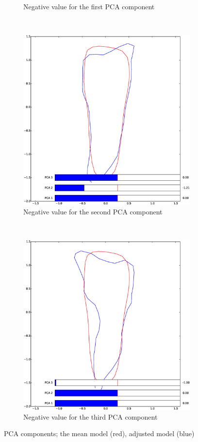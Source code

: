\documentclass[a4paper,10pt]{article}
\begin{document}
\begin{figure}[htbp]
\begin{subfigure}{0.30\textwidth}
		\caption{Negative value for the first PCA component}
	\end{subfigure}
	~
	\begin{subfigure}{0.30\textwidth}
		\centering
		\includegraphics[width=\textwidth, trim=0cm 2.5cm 0cm 3cm, clip]{pca2_neg}
		\caption{Negative value for the second PCA component}
	\end{subfigure}
	~
	\begin{subfigure}{0.30\textwidth}
		\centering
		\includegraphics[width=\textwidth, trim=0cm 2.5cm 0cm 3cm, clip]{pca3_neg}
		\caption{Negative value for the third PCA component}
	\end{subfigure}
	\caption{PCA components; the mean model (red), adjusted model (blue)}
	\label{fig:pca_components}
\end{figure}
\end{document}
